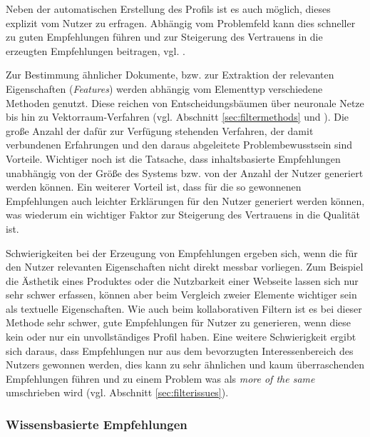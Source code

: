 Neben der automatischen Erstellung des Profils ist es auch möglich, dieses explizit vom Nutzer zu erfragen. Abhängig vom Problemfeld kann dies schneller zu guten Empfehlungen führen und zur Steigerung des Vertrauens in die erzeugten Empfehlungen beitragen, vgl. \citep{hb_20}.

Zur Bestimmung ähnlicher Dokumente, bzw. zur Extraktion der relevanten Eigenschaften (\textit{Features}) werden abhängig vom Elementtyp verschiedene Methoden genutzt. Diese reichen von Entscheidungsbäumen über neuronale Netze bis hin zu Vektorraum-Verfahren (vgl. Abschnitt \ref{sec:filtermethods} und \citep[Kap. 3]{rs}). Die große Anzahl der dafür zur Verfügung stehenden Verfahren, der damit verbundenen Erfahrungen und den daraus abgeleitete Problembewusstsein sind Vorteile. Wichtiger noch ist die Tatsache, dass inhaltsbasierte Empfehlungen unabhängig von der Größe des Systems bzw. von der Anzahl der Nutzer generiert werden können. Ein weiterer Vorteil ist, dass für die so gewonnenen Empfehlungen auch leichter Erklärungen für den Nutzer generiert werden können, was wiederum ein wichtiger Faktor zur Steigerung des Vertrauens in die Qualität ist.

Schwierigkeiten bei der Erzeugung von Empfehlungen ergeben sich, wenn die für den Nutzer relevanten Eigenschaften nicht direkt messbar vorliegen. Zum Beispiel die Ästhetik eines Produktes oder die Nutzbarkeit einer Webseite lassen sich nur sehr schwer erfassen, können aber beim Vergleich zweier Elemente wichtiger sein als textuelle Eigenschaften. Wie auch beim kollaborativen Filtern ist es bei dieser Methode sehr schwer, gute Empfehlungen für Nutzer zu generieren, wenn diese kein oder nur ein unvollständiges Profil haben. Eine weitere Schwierigkeit ergibt sich daraus, dass Empfehlungen nur aus dem bevorzugten Interessenbereich des Nutzers gewonnen werden, dies kann zu sehr ähnlichen und kaum überraschenden Empfehlungen führen und zu einem Problem was als \textit{more of the same} umschrieben wird (vgl. Abschnitt \ref{sec:filterissues}).  \citep[Kap. 3]{rs} \citep{hb_03}


\subsubsection{Wissensbasierte Empfehlungen}

